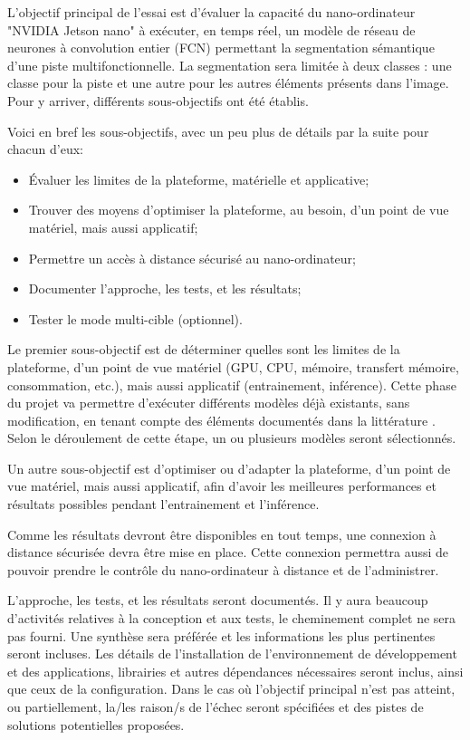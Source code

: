 \par L'objectif principal de l'essai est d'évaluer la capacité du nano-ordinateur "NVIDIA Jetson nano" à exécuter, en temps réel, un modèle de réseau de neurones à convolution entier (FCN) permettant la segmentation sémantique d'une piste multifonctionnelle. La segmentation sera limitée à deux classes : une classe pour la piste et une autre pour les autres éléments présents dans l'image. Pour y arriver, différents sous-objectifs ont été établis. 
\par Voici en bref les sous-objectifs, avec un peu plus de détails par la suite pour chacun d'eux: 
\begin{itemize}
   \item Évaluer les limites de la plateforme, matérielle et applicative; 
   \item Trouver des moyens d'optimiser la plateforme, au besoin, d'un point de vue matériel, mais aussi applicatif; 
   \item Permettre un accès à distance sécurisé au nano-ordinateur;
   \item Documenter l'approche, les tests, et les résultats;
   \item Tester le mode multi-cible (optionnel). 
\end{itemize}
\vspace{1\baselineskip}
\par Le premier sous-objectif est de déterminer quelles sont les limites de la plateforme, d'un point de vue matériel (GPU, CPU, mémoire, transfert mémoire, consommation, etc.), mais aussi applicatif (entrainement, inférence). Cette phase du projet va permettre d'exécuter différents modèles déjà existants, sans  modification, en tenant compte des éléments documentés dans la littérature \cite{nguyen_mavnet_2019} \cite{jia_real-time_2020} \cite{nvidia_jetson_2019-1}. Selon le déroulement de cette étape, un ou plusieurs modèles seront sélectionnés. 
\par Un autre sous-objectif est d'optimiser ou d'adapter la plateforme, d'un point de vue matériel, mais aussi applicatif, afin d'avoir les meilleures performances et résultats possibles pendant l'entrainement et l'inférence.
\par Comme les résultats devront être disponibles en tout temps, une connexion à distance sécurisée devra être mise en place. Cette connexion permettra aussi de pouvoir prendre le contrôle du nano-ordinateur à distance et de l'administrer.
\par L'approche, les tests, et les résultats seront documentés. Il y aura beaucoup d'activités relatives à la conception et aux tests, le cheminement complet ne sera pas fourni. Une synthèse sera préférée et les informations les plus pertinentes seront incluses. Les détails de l'installation de l'environnement de développement et des applications, librairies et autres dépendances nécessaires seront inclus, ainsi que ceux de la configuration. Dans le cas où l'objectif principal n'est pas atteint, ou partiellement, la/les raison/s de l'échec seront spécifiées et des pistes de solutions potentielles proposées.
